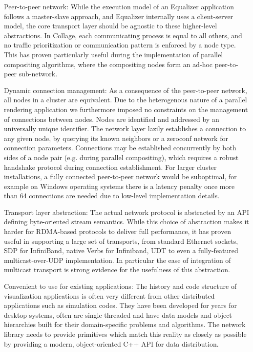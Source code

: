 \begin{compactdesc}

\item[Peer-to-peer network:] While the execution model of an Equalizer
application follows a master-slave approach, and Equalizer internally uses a
client-server model, the core transport layer should be agnostic to these
higher-level abstractions. In Collage, each communicating process is equal to
all others, and no traffic prioritization or communication pattern is enforced
by a node type. This has proven particularly useful during the implementation of
parallel compositing algorithms, where the compositing nodes form an ad-hoc
peer-to-peer sub-network.

\item[Dynamic connection management:] As a consequence of the peer-to-peer
network, all nodes in a cluster are equivalent. Due to the heterogenous nature
of a parallel rendering application we furthermore imposed no constraints on
the management of connections between nodes. Nodes are identified and addressed
by an universally unique identifier. The network layer lazily establishes a
connection to any given node, by querying its known neighbors or a zeroconf
network for connection parameters. Connections may be established concurrently
by both sides of a node pair (e.g. during parallel compositing), which requires
a robust handshake protocol during connection establishment. For larger cluster
installations, a fully connected peer-to-peer network would be suboptimal, for
example on Windows operating systems there is a latency penalty once more than
64 connections are needed due to low-level implementation details.

\item[Transport layer abstraction:] The actual network protocol is abstracted
by an API defining byte-oriented stream semantics. While this choice of
abstraction makes it harder for RDMA-based protocols to deliver full
performance, it has proven useful in supporting a large set of transports, from
standard Ethernet sockets, SDP for InfiniBand, native Verbs for Infiniband, UDT
to even a fully-featured multicast-over-UDP implementation. In particular the
ease of integration of multicast transport is strong evidence for the
usefulness of this abstraction.

\item[Convenient to use for existing applications:] The history and code
structure of visualization applications is often very different from other
distributed applications such as simulation codes. They have been developed for
years for desktop systems, often are single-threaded and have data models and
object hierarchies built for their domain-specific problems and algorithms. The
network library needs to provide primitives which match this reality as closely
as possible by providing a modern, object-oriented C++ API for data
distribution.

\end{compactdesc}


